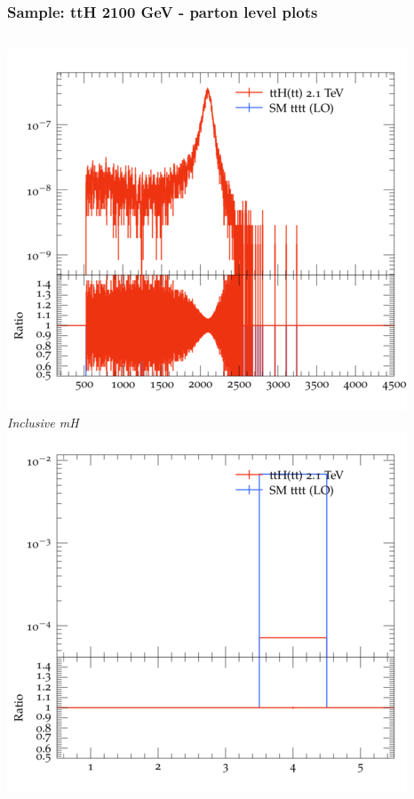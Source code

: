 \documentclass{beamer}
\begin{document}
\begin{frame}
\frametitle{Sample: ttH 2100 GeV - parton level plots}
\begin{columns}
\includegraphics[width=\textwidth]{../plots/ttH_2100/tttt_ttH/Inclusive_mH.png}\\
\textit{\small Inclusive mH}
\includegraphics[width=\textwidth]{../plots/ttH_2100/tttt_ttH/Inclusive_nTop.png}\\

\end{columns}
\end{frame}
\end{document}
